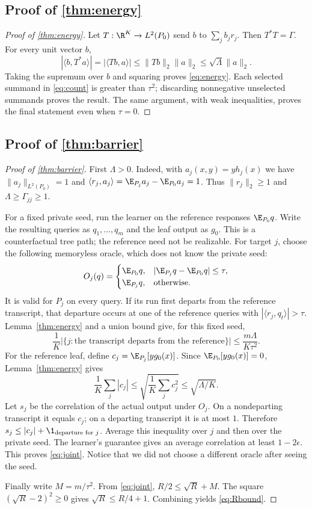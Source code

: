 \subsection[Proof of result energy]{Proof of \cref{thm:energy}}\label{proof:energy}
\begin{proof}[Proof of \cref{thm:energy}]
Let $T:\R^K\to L^2(P_0)$ send $b$ to $\sum_jb_jr_j$. Then $T^*T=\Gamma$. For every unit vector $b$,
\[
 |\langle b,T^*a\rangle|=|\langle Tb,a\rangle|
 \leq\|Tb\|_2\|a\|_2\leq\sqrt\Lambda\|a\|_2.
\]
Taking the supremum over $b$ and squaring proves \eqref{eq:energy}. Each selected summand in \eqref{eq:count} is greater than $\tau^2$; discarding nonnegative unselected summands proves the result. The same argument, with weak inequalities, proves the final statement even when $\tau=0$.
\end{proof}

\subsection[Proof of result barrier]{Proof of \cref{thm:barrier}}\label{proof:barrier}
\begin{proof}[Proof of \cref{thm:barrier}]
First $\Lambda>0$. Indeed, with $a_j(x,y)=y h_j(x)$ we have $\|a_j\|_{L^2(P_0)}=1$ and
$\langle r_j,a_j\rangle=\E_{P_j}a_j-\E_{P_0}a_j=1$. Thus $\|r_j\|_2\geq1$ and $\Lambda\geq\Gamma_{jj}\geq1$.

For a fixed private seed, run the learner on the reference responses $\E_{P_0}q$. Write the resulting queries as $q_1,\ldots,q_m$ and the leaf output as $g_0$. This is a counterfactual tree path; the reference need not be realizable. For target $j$, choose the following memoryless oracle, which does not know the private seed:
\[
 O_j(q)=
 \begin{cases}
 \E_{P_0}q,&|\E_{P_j}q-\E_{P_0}q|\leq\tau,\\
 \E_{P_j}q,&\text{otherwise}.
 \end{cases}
\]
It is valid for $P_j$ on every query. If its run first departs from the reference transcript, that departure occurs at one of the reference queries with $|\langle r_j,q_t\rangle|>\tau$. Lemma~\ref{thm:energy} and a union bound give, for this fixed seed,
\[
 \frac1K\bigl|\{j:\text{the transcript departs from the reference}\}\bigr|
 \leq\frac{m\Lambda}{K\tau^2}.
\]
For the reference leaf, define $c_j=\E_{P_j}[y g_0(x)]$. Since $\E_{P_0}[y g_0(x)]=0$, Lemma~\ref{thm:energy} gives
\[
 \frac1K\sum_j|c_j|\leq
 \sqrt{\frac1K\sum_jc_j^2}\leq\sqrt{\Lambda/K}.
\]
Let $s_j$ be the correlation of the actual output under $O_j$. On a nondeparting transcript it equals $c_j$; on a departing transcript it is at most $1$. Therefore
$s_j\leq|c_j|+\1_{\text{departure for }j}$.
Average this inequality over $j$ and then over the private seed. The learner's guarantee gives an average correlation at least $1-2\epsilon$. This proves \eqref{eq:joint}. Notice that we did not choose a different oracle after seeing the seed.

Finally write $M=m/\tau^2$. From \eqref{eq:joint}, $R/2\leq\sqrt R+M$. The square $(\sqrt R-2)^2\geq0$ gives $\sqrt R\leq R/4+1$. Combining yields \eqref{eq:Rbound}.
\end{proof}

